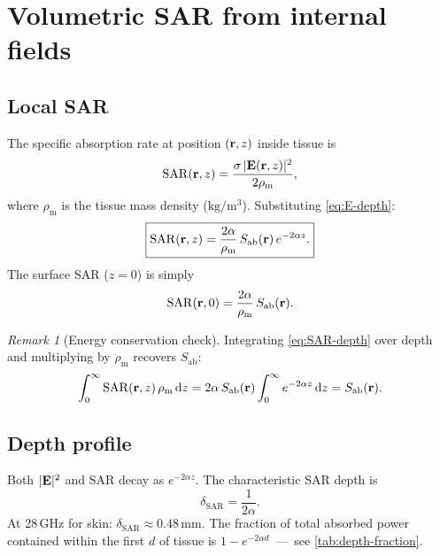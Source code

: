 \documentclass[11pt,a4paper]{article}
\theoremstyle{definition}
\theoremstyle{remark}
\newtheorem{remark}[theorem]{Remark}
\newcommand{\Sab}{S_{\mathrm{ab}}}
\newcommand{\SAR}{\ensuremath{\mathrm{SAR}}}
\newcommand{\rhom}{\rho_{\mathrm{m}}}
\begin{document}
\section{Volumetric SAR from internal fields}
\label{sec:volumetric-sar}

\subsection{Local SAR}

The specific absorption rate at position $(\vb{r}, z)$ inside tissue is
\begin{equation}\label{eq:SAR-def}
  \SAR(\vb{r}, z) = \frac{\sigma\,|\vb{E}(\vb{r}, z)|^2}{2\rhom},
\end{equation}
where $\rhom$ is the tissue mass density ($\mathrm{kg/m^3}$).
Substituting \cref{eq:E-depth}:
\begin{equation}\label{eq:SAR-depth}
  \boxed{%
    \SAR(\vb{r}, z) = \frac{2\alpha}{\rhom}\,\Sab(\vb{r})\,e^{-2\alpha z}.
  }
\end{equation}
The surface SAR ($z = 0$) is simply
\begin{equation}\label{eq:SAR-surface}
  \SAR(\vb{r}, 0) = \frac{2\alpha}{\rhom}\,\Sab(\vb{r}).
\end{equation}

\begin{remark}[Energy conservation check]
Integrating \cref{eq:SAR-depth} over depth and multiplying by $\rhom$ recovers
$\Sab$:
\[
  \int_0^\infty \SAR(\vb{r},z)\,\rhom\,\mathrm{d}z
  = 2\alpha\,\Sab(\vb{r})\int_0^\infty e^{-2\alpha z}\,\mathrm{d}z
  = \Sab(\vb{r}).
\]
\end{remark}

\subsection{Depth profile}

Both $|\vb{E}|^2$ and SAR decay as $e^{-2\alpha z}$. The characteristic
SAR depth is
\begin{equation}\label{eq:delta-SAR}
  \delta_{\SAR} = \frac{1}{2\alpha}.
\end{equation}
At 28\,GHz for skin: $\delta_{\SAR} \approx 0.48$\,mm. The fraction of total
absorbed power contained within the first $d$ of tissue is
$1 - e^{-2\alpha d}$~---~see \cref{tab:depth-fraction}.
\end{document}

